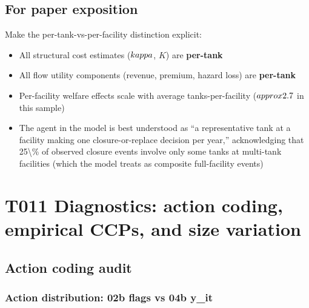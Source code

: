 \documentclass[
  11pt,
]{article}
\providecommand{\tightlist}{%
  \setlength{\itemsep}{0pt}\setlength{\parskip}{0pt}}\usepackage{longtable,booktabs,array}
\begin{document}
\subsection{For paper exposition}\label{for-paper-exposition}

Make the per-tank-vs-per-facility distinction explicit:

\begin{itemize}
\tightlist
\item
  All structural cost estimates (\(\\kappa\), \(K\)) are
  \textbf{per-tank}
\item
  All flow utility components (revenue, premium, hazard loss) are
  \textbf{per-tank}
\item
  Per-facility welfare effects scale with average tanks-per-facility
  (\(\\approx 2.7\) in this sample)
\item
  The agent in the model is best understood as ``a representative tank
  at a facility making one closure-or-replace decision per year,''
  acknowledging that 25\textbackslash\% of observed closure events
  involve only some tanks at multi-tank facilities (which the model
  treats as composite full-facility events)
\end{itemize}

\section{T011 Diagnostics: action coding, empirical CCPs, and size
variation}\label{sec-t011}

\subsection{Action coding audit}\label{sec-t011-action}

\subsubsection{Action distribution: 02b flags vs 04b
y\_it}\label{sec-t011-a1}
\end{document}
